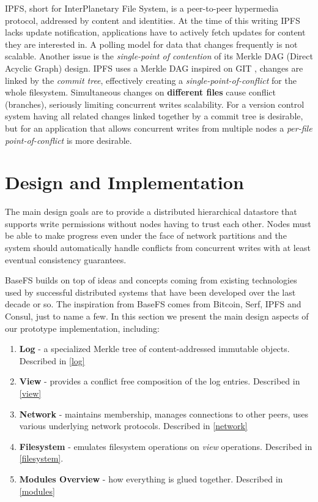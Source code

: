 \documentclass{sig-alternate}
\begin{document}
IPFS, short for InterPlanetary File System, is a peer-to-peer hypermedia protocol, addressed by content and identities\cite{IPFS}. At the time of this writing IPFS lacks update notification, applications have to actively fetch updates for content they are interested in. A polling model for data that changes frequently is not scalable. Another issue is the \textit{single-point of contention} of its Merkle DAG (Direct Acyclic Graph) design. IPFS uses a Merkle DAG inspired on GIT \cite{merkledag}, changes are linked by the \textit{commit tree}, effectively creating a \textit{single-point-of-conflict} for the whole filesystem. Simultaneous changes on \textbf{different files} cause conflict (branches), seriously limiting concurrent writes scalability. For a version control system having all related changes linked together by a commit tree is desirable, but for an application that allows concurrent writes from multiple nodes a \textit{per-file point-of-conflict} is more desirable. 


\section{Design and Implementation} \label{design}

The main design goals are to provide a distributed hierarchical datastore that supports write permissions without nodes having to trust each other. Nodes must be able to make progress even under the face of network partitions and the system should automatically handle conflicts from concurrent writes with at least eventual consistency guarantees.

BaseFS builds on top of ideas and concepts coming from existing technologies used by successful distributed systems that have been developed over the last decade or so. The inspiration from BaseFS comes from Bitcoin, Serf, IPFS and Consul, just to name a few. In this section we present the main design aspects of our prototype implementation, including:

\begin{enumerate}
\item \textbf{Log} - a specialized Merkle tree of content-addressed immutable objects. Described in \ref{log}
\item \textbf{View} - provides a conflict free composition of the log entries. Described in \ref{view}
\item \textbf{Network} - maintains membership, manages connections to other peers, uses various underlying network protocols. Described in \ref{network}
\item \textbf{Filesystem} - emulates filesystem operations on \textit{view} operations. Described in \ref{filesystem}.
\item \textbf{Modules Overview} - how everything is glued together. Described in \ref{modules}
\end{enumerate}
\end{document}
